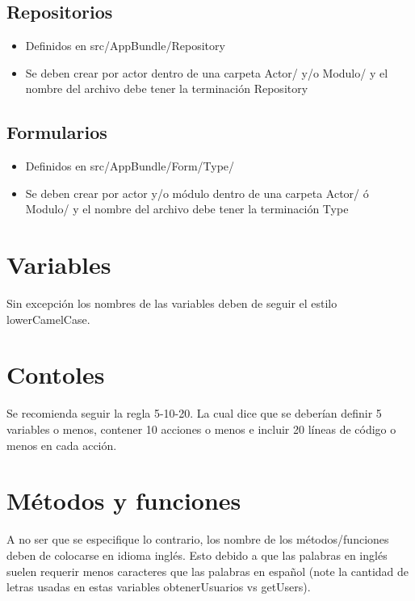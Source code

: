 \subsection{Repositorios}
\begin{itemize}
\item Definidos en src/AppBundle/Repository

\item Se deben crear por actor dentro de una carpeta Actor/ y/o Modulo/ y el nombre del archivo debe tener la terminación Repository

\end{itemize}
\subsection{Formularios}
\begin{itemize}
\item Definidos en src/AppBundle/Form/Type/

\item Se deben crear por actor y/o módulo dentro de una carpeta Actor/ ó Modulo/ y el nombre del archivo debe tener la terminación Type

\end{itemize}

\section{Variables}
Sin excepción los nombres de las variables deben de seguir el estilo lowerCamelCase.

\section{Contoles}
Se recomienda seguir la regla 5-10-20. La cual dice que se deberían definir 5 variables o menos, contener 10 acciones o menos e incluir 20 líneas de código o menos en cada acción.

\section{Métodos y funciones}
A no ser que se especifique lo contrario, los nombre de los métodos/funciones deben de colocarse en idioma inglés. Esto debido a que las palabras en inglés suelen requerir menos caracteres que las palabras en español (note la cantidad de letras usadas en estas variables obtenerUsuarios vs getUsers).
\newpage
